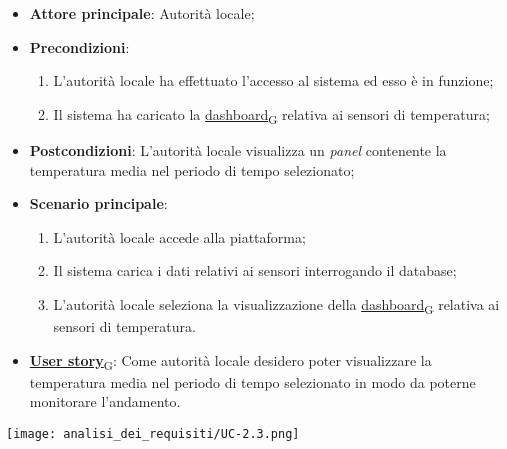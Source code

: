 \begin{itemize}
	\item \textbf{Attore principale}: Autorità locale;
	\item \textbf{Precondizioni}:
	      \begin{enumerate}
		      \item L'autorità locale ha effettuato l'accesso al sistema ed esso è in funzione;
		      \item Il sistema ha caricato la \href{https://7last.github.io/docs/rtb/documentazione-interna/glossario\#dashboard}{dashboard\textsubscript{G}} relativa ai sensori di temperatura;
	      \end{enumerate}
	\item \textbf{Postcondizioni}: L'autorità locale visualizza un \textit{panel} contenente la temperatura media nel periodo di tempo selezionato;
	\item \textbf{Scenario principale}:
	      \begin{enumerate}
		      \item L'autorità locale accede alla piattaforma;
		      \item Il sistema carica i dati relativi ai sensori interrogando il database;
		      \item L'autorità locale seleziona la visualizzazione della \href{https://7last.github.io/docs/rtb/documentazione-interna/glossario\#dashboard}{dashboard\textsubscript{G}} relativa ai sensori di temperatura.
	      \end{enumerate}
	\item \href{https://7last.github.io/docs/rtb/documentazione-interna/glossario\#user-story}{\textbf{User story}\textsubscript{G}}: Come autorità locale desidero poter visualizzare la temperatura media nel periodo di tempo selezionato
	      in modo da poterne monitorare l'andamento.
\end{itemize}
\begin{center}
	\texttt{[image: analisi\_dei\_requisiti/UC-2.3.png]}
\end{center}

